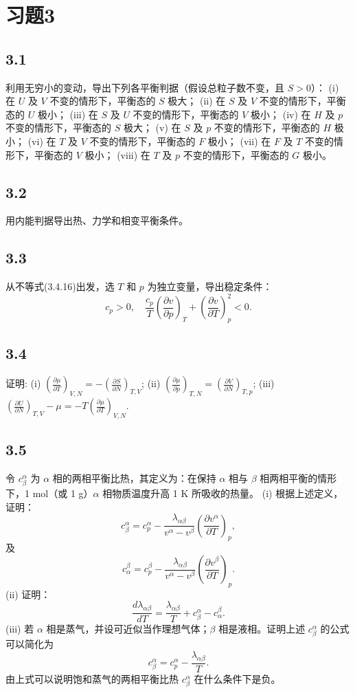 \section{习题3}

\newpage
\subsection{3.1}
利用无穷小的变动，导出下列各平衡判据（假设总粒子数不变，且 $S>0$）：
(i) 在 $U$ 及 $V$ 不变的情形下，平衡态的 $S$ 极大；
(ii) 在 $S$ 及 $V$ 不变的情形下，平衡态的 $U$ 极小；
(iii) 在 $S$ 及 $U$ 不变的情形下，平衡态的 $V$ 极小；
(iv) 在 $H$ 及 $p$ 不变的情形下，平衡态的 $S$ 极大；
(v) 在 $S$ 及 $p$ 不变的情形下，平衡态的 $H$ 极小；
(vi) 在 $T$ 及 $V$ 不变的情形下，平衡态的 $F$ 极小；
(vii) 在 $F$ 及 $T$ 不变的情形下，平衡态的 $V$ 极小；
(viii) 在 $T$ 及 $p$ 不变的情形下，平衡态的 $G$ 极小。

\newpage
\subsection{3.2}
用内能判据导出热、力学和相变平衡条件。

\newpage
\subsection{3.3}
从不等式(3.4.16)出发，选 $T$ 和 $p$ 为独立变量，导出稳定条件：
$$c_p > 0, \quad \frac{c_p}{T} \left( \frac{\partial v}{\partial p} \right)_T + \left( \frac{\partial v}{\partial T} \right)_p^2 < 0.$$

\newpage
\subsection{3.4}
证明:
(i) $\left( \frac{\partial \mu}{\partial T} \right)_{V,N} = - \left( \frac{\partial S}{\partial N} \right)_{T,V}$;
(ii) $\left( \frac{\partial \mu}{\partial p} \right)_{T,N} = \left( \frac{\partial V}{\partial N} \right)_{T,p}$;
(iii) $\left( \frac{\partial U}{\partial N} \right)_{T,V} - \mu = - T \left( \frac{\partial \mu}{\partial T} \right)_{V,N}$.

\newpage
\subsection{3.5}
令 $c_\beta^\alpha$ 为 $\alpha$ 相的两相平衡比热，其定义为：在保持 $\alpha$ 相与 $\beta$ 相两相平衡的情形下，1 mol（或 1 g）$\alpha$ 相物质温度升高 1 K 所吸收的热量。
(i) 根据上述定义，证明：
$$c_{\beta}^{\alpha} = c_{p}^{\alpha} - \frac{\lambda_{\alpha\beta}}{v^{\alpha} - v^{\beta}} \left( \frac{\partial v^{\alpha}}{\partial T} \right)_{p},$$
及
$$c_{\alpha}^{\beta} = c_{p}^{\beta} - \frac{\lambda_{\alpha\beta}}{v^{\alpha} - v^{\beta}} \left( \frac{\partial v^{\beta}}{\partial T} \right)_{p}.$$
(ii) 证明：
$$\frac{d\lambda_{\alpha\beta}}{dT} = \frac{\lambda_{\alpha\beta}}{T} + c_{\beta}^{\alpha} - c_{\alpha}^{\beta}.$$
(iii) 若 $\alpha$ 相是蒸气，并设可近似当作理想气体；$\beta$ 相是液相。证明上述 $c_{\beta}^{\alpha}$ 的公式可以简化为
$$c_{\beta}^{\alpha} = c_{p}^{\alpha} - \frac{\lambda_{\alpha\beta}}{T}.$$
由上式可以说明饱和蒸气的两相平衡比热 $c_{\beta}^{\alpha}$ 在什么条件下是负。

